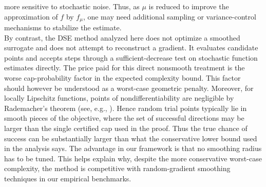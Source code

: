 \documentclass[11pt,a4paper]{article}
\newcommand{\Dexp}{p}
\begin{document}
more sensitive to stochastic noise. Thus, as \(\mu\) is reduced to improve the
approximation of \(f\) by \(f_\mu\), one may need additional sampling or
variance-control mechanisms to stabilize the estimate.\\
By contrast, the DSE method analyzed here does not optimize a smoothed
surrogate and does not attempt to reconstruct a gradient. It evaluates
candidate points and accepts steps through a sufficient-decrease test on
stochastic function estimates directly. The price paid for this direct
nonsmooth treatment is the worse cap-probability factor in the expected
complexity bound. This factor should however be understood as a worst-case
geometric penalty.
Moreover, for locally Lipschitz functions, points of nondifferentiability are
negligible by Rademacher's theorem  (see, e.g.,
\cite[Section~2.5]{Clarke1990}). Hence random trial points typically lie in
smooth pieces of the objective, where the set of successful directions may be
larger than the single certified cap used in the proof. Thus the true chance of
success can be substantially larger than what the conservative lower bound used
in the analysis says. The advantage in our framework is that no smoothing radius
has to be tuned. This helps explain why, despite the more conservative
worst-case complexity, the method is competitive with random-gradient smoothing
techniques in our empirical benchmarks.






\end{document}
